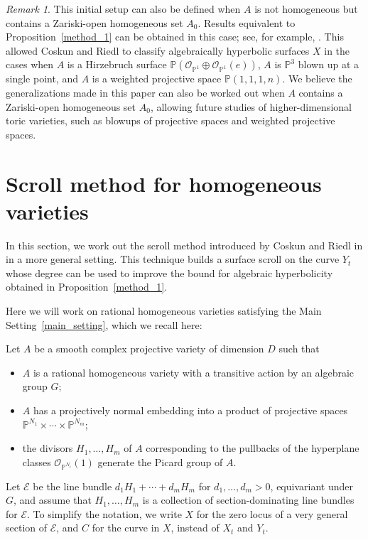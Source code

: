 \documentclass[10pt,a4paper]{article}
\numberwithin{equation}{section}
\theoremstyle{definition}
\theoremstyle{remark}
\newtheorem{remark}[theorem]{Remark}
\newcommand{\cO}{\mathcal{O}}
\renewcommand{\P}{\mathbb{P}}
\begin{document}
\begin{remark}
    This initial setup can also be defined when $A$ is not homogeneous but contains a Zariski-open homogeneous set $A_0$. Results equivalent to Proposition~\ref{method_1} can be obtained in this case; see, for example, \cite[Theorem 1.2]{CR19}. This allowed Coskun and Riedl \cite{CR19} to classify algebraically hyperbolic surfaces $X$ in the cases when $A$ is a Hirzebruch surface $\P(\cO_{\P^1}\oplus \cO_{\P^1}(e))$, $A$ is $\P^3$ blown up at a single point, and $A$ is a weighted projective space $\P(1,1,1,n)$. We believe the generalizations made in this paper can also be worked out when $A$ contains a Zariski-open homogeneous set $A_0$, allowing future studies of higher-dimensional toric varieties, such as blowups of projective spaces and weighted projective spaces.
\end{remark}


\section{Scroll method for homogeneous varieties}\label{sec3}

In this section, we work out the scroll method introduced by Coskun and Riedl in \cite{CR19} in a more general setting. This technique builds a surface scroll on the curve $Y_t$ whose degree can be used to improve the bound for algebraic hyperbolicity obtained in Proposition~\ref{method_1}.

Here we will work on rational homogeneous varieties satisfying the Main Setting~\ref{main_setting}, which we recall here:

 Let $A$ be a smooth complex projective variety of dimension $D$ such that
    \begin{itemize}
        \item $A$ is a rational homogeneous variety with a transitive action by an algebraic group $G$;
        \item $A$ has a projectively normal embedding into a product of projective spaces $\P^{N_1}\times \cdots \times \P^{N_m}$;
        \item the divisors $H_1, \hdots , H_m$ of $A$ corresponding to the pullbacks of the hyperplane classes $\cO_{\P^{N_i}}(1)$ generate the Picard group of $A$.
    \end{itemize}

    Let $\mathcal{E}$ be the line bundle $d_1H_1 + \cdots + d_mH_m$ for $d_1,\hdots ,d_m >0$, equivariant under $G$, and assume that $H_1, \hdots , H_m$ is a collection of section-dominating line bundles for $\mathcal{E}$. To simplify the notation, we write $X$ for the zero locus of a very general section of $\mathcal{E}$, and $C$ for the curve in $X$, instead of $X_t$ and $Y_t$.
    
\end{document}
